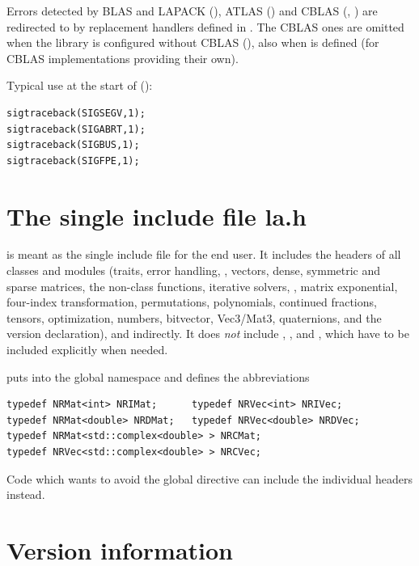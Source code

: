 Errors detected by BLAS and LAPACK (), ATLAS () and CBLAS (,
) are redirected to  by replacement handlers defined in . The CBLAS ones
are omitted when the library is configured without CBLAS (),  also when
 is defined (for CBLAS implementations providing their own).

Typical use at the start of  ():
\begin{lstlisting}
sigtraceback(SIGSEGV,1);
sigtraceback(SIGABRT,1);
sigtraceback(SIGBUS,1);
sigtraceback(SIGFPE,1);
\end{lstlisting}


\section{The single include file la.h}\label{sec:utilities:la}

 is meant as the single include file for the end user. It includes the headers of all classes and modules
(traits, error handling, , vectors, dense, symmetric and sparse matrices, the non-class functions,
iterative solvers, , matrix exponential, four-index transformation, permutations, polynomials, continued
fractions, tensors, optimization, numbers, bitvector, Vec3/Mat3, quaternions,  and the version
declaration), and  indirectly. It does \emph{not} include , ,
 and , which have to be included explicitly when needed.

 puts  into the global namespace and defines the abbreviations
\begin{lstlisting}
typedef NRMat<int> NRIMat;      typedef NRVec<int> NRIVec;
typedef NRMat<double> NRDMat;   typedef NRVec<double> NRDVec;
typedef NRMat<std::complex<double> > NRCMat;
typedef NRVec<std::complex<double> > NRCVec;
\end{lstlisting}
Code which wants to avoid the global  directive can include the individual headers instead.

\section{Version information}\label{sec:utilities:version}

